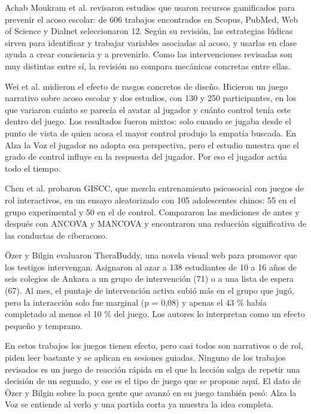 \documentclass[conference]{IEEEtran}
\begin{document}
Achab Moukram et al. \cite{ref6} revisaron estudios que usaron recursos gamificados para prevenir el acoso escolar: de 606 trabajos encontrados en Scopus, PubMed, Web of Science y Dialnet seleccionaron 12. Según su revisión, las estrategias lúdicas sirven para identificar y trabajar variables asociadas al acoso, y usarlas en clase ayuda a crear conciencia y a prevenirlo. Como las intervenciones revisadas son muy distintas entre sí, la revisión no compara mecánicas concretas entre ellas.

Wei et al. \cite{ref7} midieron el efecto de rasgos concretos de diseño. Hicieron un juego narrativo sobre acoso escolar y dos estudios, con 130 y 250 participantes, en los que variaron cuánto se parecía el avatar al jugador y cuánto control tenía este dentro del juego. Los resultados fueron mixtos: solo cuando se jugaba desde el punto de vista de quien acosa el mayor control produjo la empatía buscada. En Alza la Voz el jugador no adopta esa perspectiva, pero el estudio muestra que el grado de control influye en la respuesta del jugador. Por eso el jugador actúa todo el tiempo.

Chen et al. \cite{ref8} probaron GISCC, que mezcla entrenamiento psicosocial con juegos de rol interactivos, en un ensayo aleatorizado con 105 adolescentes chinos: 55 en el grupo experimental y 50 en el de control. Compararon las mediciones de antes y después con ANCOVA y MANCOVA y encontraron una reducción significativa de las conductas de ciberacoso.

Özer y Bilgin \cite{ref9} evaluaron TheraBuddy, una novela visual web para promover que los testigos intervengan. Asignaron al azar a 138 estudiantes de 10 a 16 años de seis colegios de Ankara a un grupo de intervención (71) o a una lista de espera (67). Al mes, el puntaje de intervención activa subió más en el grupo que jugó, pero la interacción solo fue marginal (p = 0,08) y apenas el 43 \% había completado al menos el 10 \% del juego. Los autores lo interpretan como un efecto pequeño y temprano.

En estos trabajos los juegos tienen efecto, pero casi todos son narrativos o de rol, piden leer bastante y se aplican en sesiones guiadas. Ninguno de los trabajos revisados es un juego de reacción rápida en el que la lección salga de repetir una decisión de un segundo, y ese es el tipo de juego que se propone aquí. El dato de Özer y Bilgin sobre la poca gente que avanzó en su juego también pesó: Alza la Voz se entiende al verlo y una partida corta ya muestra la idea completa.
\end{document}
